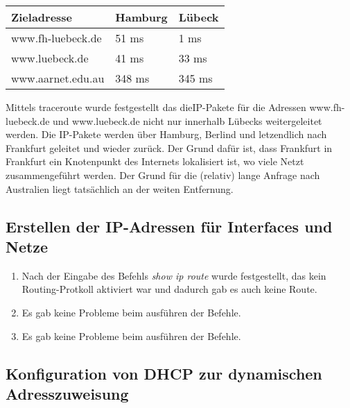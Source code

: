 \documentclass{scrartcl}
\begin{document}
     \begin{table}[htbp]
  \begin{tabular}{|l|ll}
      \textbf{Zieladresse} & \textbf{Hamburg} & \textbf{Lübeck}\\ \hline
		 www.fh-luebeck.de & 51 ms & 1 ms \\
		 www.luebeck.de & 41 ms & 33 ms\\
		 www.aarnet.edu.au & 348 ms & 345 ms\\
    \end{tabular}
    \end{table}
    
    Mittels traceroute wurde festgestellt das dieIP-Pakete für die Adressen www.fh-luebeck.de und www.luebeck.de nicht nur innerhalb Lübecks weitergeleitet werden. Die IP-Pakete werden über Hamburg, Berlind und letzendlich nach Frankfurt geleitet und wieder zurück. Der Grund dafür ist, dass Frankfurt in Frankfurt ein Knotenpunkt des Internets lokalisiert ist, wo viele Netzt zusammengeführt werden.
    Der Grund für die (relativ) lange Anfrage nach Australien liegt tatsächlich an der weiten Entfernung.
    
    \newpage
  \subsection[Aufgabe 4 Erstellen der IP-Adressen für Interfaces und Netze]{Erstellen der IP-Adressen für Interfaces und Netze}
  
  \renewcommand{\labelenumi}{\alph{enumi})}
  \begin{enumerate}
  \item
  Nach der Eingabe des Befehls \textit{show ip route} wurde festgestellt, das kein Routing-Protkoll aktiviert war und dadurch gab es auch keine Route.
  
  \item
  Es gab keine Probleme beim ausführen der Befehle.
  
  \item
  Es gab keine Probleme beim ausführen der Befehle.
  \end{enumerate}
  
  \subsection[Aufgabe 5 Konfiguration von DHCP zur dynamischen Adresszuweisung]{Konfiguration von DHCP zur dynamischen Adresszuweisung}
  
\end{document}
